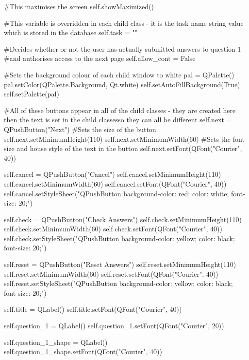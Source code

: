 \begin{landscape}
\begin{python}
        #This maximises the screen
        self.showMaximized()

        #This variable is overridden in each child class - it is the task name string value which is stored in the database
        self.task = ""

        #Decides whether or not the user has actually submitted answers to question 1
        #and authorises access to the next page
        self.allow_cont = False

        #Sets the background colour of each child window to white
        pal = QPalette()
        pal.setColor(QPalette.Background, Qt.white)
        self.setAutoFillBackground(True)
        self.setPalette(pal)     

        #All of these buttons appear in all of the child classes - they are created here then the text is set in the child classesso they can all be different
        self.next = QPushButton("Next")
        #Sets the size of the button
        self.next.setMinimumHeight(110)
        self.next.setMinimumWidth(60)
        #Sets the font size and house style of the text in the button
        self.next.setFont(QFont("Courier", 40))

        self.cancel = QPushButton("Cancel")
        self.cancel.setMinimumHeight(110)
        self.cancel.setMinimumWidth(60)
        self.cancel.setFont(QFont("Courier", 40))
        self.cancel.setStyleSheet("QPushButton {background-color: red; color: white; font-size: 20;}")
        
        self.check = QPushButton("Check Answers")
        self.check.setMinimumHeight(110)
        self.check.setMinimumWidth(60)
        self.check.setFont(QFont("Courier", 40))
        self.check.setStyleSheet("QPushButton {background-color: yellow; color: black; font-size: 20;}")
        
        self.reset = QPushButton("Reset Answers")
        self.reset.setMinimumHeight(110)
        self.reset.setMinimumWidth(60)
        self.reset.setFont(QFont("Courier", 40))
        self.reset.setStyleSheet("QPushButton {background-color: yellow; color: black; font-size: 20;}")

        self.title = QLabel()
        self.title.setFont(QFont("Courier", 40))

        self.question_1 = QLabel()
        self.question_1.setFont(QFont("Courier", 20))

        self.question_1_shape = QLabel()
        self.question_1_shape.setFont(QFont("Courier", 40))
        

\end{python}
\end{landscape}
